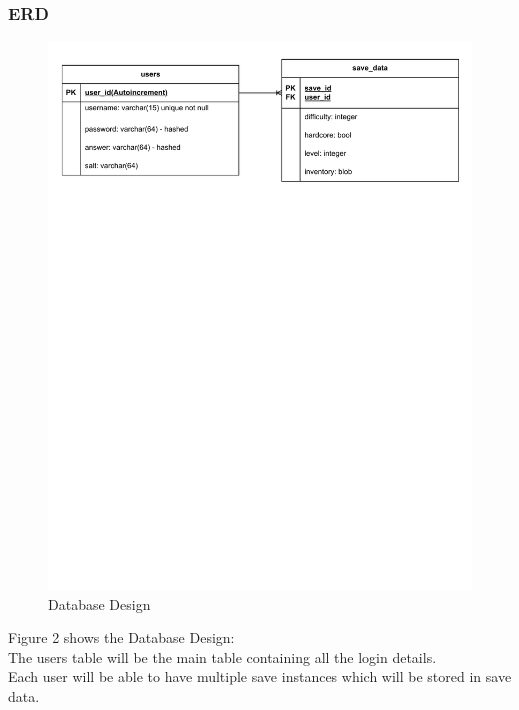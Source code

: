 \documentclass{article}
\begin{document}
        \subsubsection{ERD}
        \begin{figure}[H]
                \centering
                \includegraphics[width=\textwidth, trim = 0 575 0 25, clip]{images/design/Database_Design.pdf}
                \caption{Database Design}
                \label{fig:ie_1}
        \end{figure}
        Figure 2 shows the Database Design:\\
        The users table will be the main table containing all the login details.\\
        Each user will be able to have multiple save instances which will be stored in save data.\\
\end{document}
